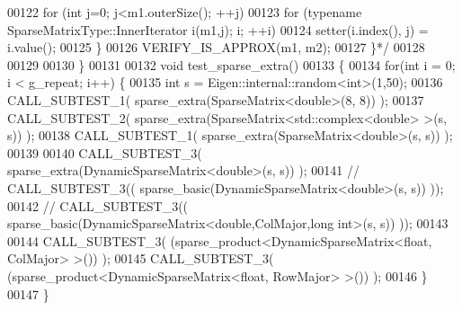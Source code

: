 \begin{DoxyCode}
00122 \textcolor{comment}{      for (int j=0; j<m1.outerSize(); ++j)}
00123 \textcolor{comment}{        for (typename SparseMatrixType::InnerIterator i(m1,j); i; ++i)}
00124 \textcolor{comment}{          setter(i.index(), j) = i.value();}
00125 \textcolor{comment}{    \}}
00126 \textcolor{comment}{    VERIFY\_IS\_APPROX(m1, m2);}
00127 \textcolor{comment}{  \}*/}
00128 
00129 
00130 \}
00131 
00132 \textcolor{keywordtype}{void} test\_sparse\_extra()
00133 \{
00134   \textcolor{keywordflow}{for}(\textcolor{keywordtype}{int} i = 0; i < g\_repeat; i++) \{
00135     \textcolor{keywordtype}{int} s = Eigen::internal::random<int>(1,50);
00136     CALL\_SUBTEST\_1( sparse\_extra(SparseMatrix<double>(8, 8)) );
00137     CALL\_SUBTEST\_2( sparse\_extra(SparseMatrix<std::complex<double> >(s, s)) );
00138     CALL\_SUBTEST\_1( sparse\_extra(SparseMatrix<double>(s, s)) );
00139 
00140     CALL\_SUBTEST\_3( sparse\_extra(DynamicSparseMatrix<double>(s, s)) );
00141 \textcolor{comment}{//    CALL\_SUBTEST\_3(( sparse\_basic(DynamicSparseMatrix<double>(s, s)) ));}
00142 \textcolor{comment}{//    CALL\_SUBTEST\_3(( sparse\_basic(DynamicSparseMatrix<double,ColMajor,long int>(s, s)) ));}
00143 
00144     CALL\_SUBTEST\_3( (sparse\_product<DynamicSparseMatrix<float, ColMajor> >()) );
00145     CALL\_SUBTEST\_3( (sparse\_product<DynamicSparseMatrix<float, RowMajor> >()) );
00146   \}
00147 \}
\end{DoxyCode}
